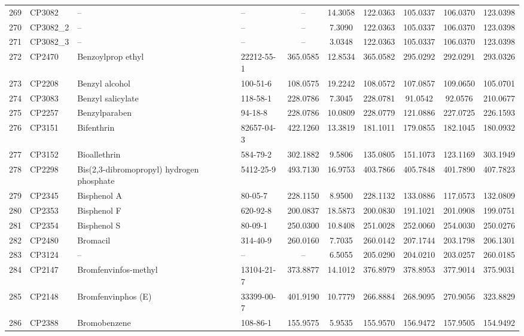 \begin{longtable}{clllcccccc}
269 & CP3082 & – & – & – & 14.3058 & 122.0363 & 105.0337 & 106.0370 & 123.0398 \\ 
270 & CP3082\_2 & – & – & – & 7.3090 & 122.0363 & 105.0337 & 106.0370 & 123.0398 \\ 
271 & CP3082\_3 & – & – & – & 3.0348 & 122.0363 & 105.0337 & 106.0370 & 123.0398 \\ 
272 & CP2470 & Benzoylprop ethyl & 22212-55-1 & 365.0585 & 12.8534 & 365.0582 & 295.0292 & 292.0291 & 293.0326 \\ 
273 & CP2208 & Benzyl alcohol & 100-51-6 & 108.0575 & 19.2242 & 108.0572 & 107.0857 & 109.0650 & 105.0701 \\ 
274 & CP3083 & Benzyl salicylate & 118-58-1 & 228.0786 & 7.3045 & 228.0781 & 91.0542 & 92.0576 & 210.0677 \\ 
275 & CP2257 & Benzylparaben & 94-18-8 & 228.0786 & 10.0809 & 228.0779 & 121.0886 & 227.0725 & 226.1593 \\ 
276 & CP3151 & Bifenthrin & 82657-04-3 & 422.1260 & 13.3819 & 181.1011 & 179.0855 & 182.1045 & 180.0932 \\ 
277 & CP3152 & Bioallethrin & 584-79-2 & 302.1882 & 9.5806 & 135.0805 & 151.1073 & 123.1169 & 303.1949 \\ 
278 & CP2298 & Bis(2,3-dibromopropyl) hydrogen phosphate & 5412-25-9 & 493.7130 & 16.9753 & 403.7866 & 405.7848 & 401.7890 & 407.7823 \\ 
279 & CP2345 & Bisphenol A & 80-05-7 & 228.1150 & 8.9500 & 228.1132 & 133.0886 & 117.0573 & 132.0809 \\ 
280 & CP2353 & Bisphenol F & 620-92-8 & 200.0837 & 18.5873 & 200.0830 & 191.1021 & 201.0908 & 199.0751 \\ 
281 & CP2354 & Bisphenol S & 80-09-1 & 250.0300 & 10.8408 & 251.0028 & 252.0060 & 254.0030 & 250.0276 \\ 
282 & CP2480 & Bromacil & 314-40-9 & 260.0160 & 7.7035 & 260.0142 & 207.1744 & 203.1798 & 206.1301 \\ 
283 & CP3124 & – & – & – & 6.5055 & 205.0290 & 204.0210 & 203.0257 & 260.0185 \\ 
284 & CP2147 & Bromfenvinfos-methyl & 13104-21-7 & 373.8877 & 14.1012 & 376.8979 & 378.8953 & 377.9014 & 375.9031 \\ 
285 & CP2148 & Bromfenvinphos (E) & 33399-00-7 & 401.9190 & 10.7779 & 266.8884 & 268.9095 & 270.9056 & 323.8829 \\ 
286 & CP2388 & Bromobenzene & 108-86-1 & 155.9575 & 5.9535 & 155.9570 & 156.9472 & 157.9505 & 154.9492 \\ 

\end{longtable}
